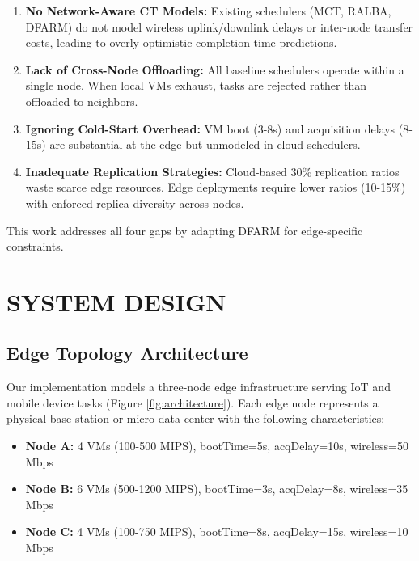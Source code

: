 \documentclass[12pt]{report}
\begin{document}
\begin{enumerate}
    \item \textbf{No Network-Aware CT Models:} Existing schedulers (MCT, RALBA, DFARM) do not model wireless uplink/downlink delays or inter-node transfer costs, leading to overly optimistic completion time predictions.
    
    \item \textbf{Lack of Cross-Node Offloading:} All baseline schedulers operate within a single node. When local VMs exhaust, tasks are rejected rather than offloaded to neighbors.
    
    \item \textbf{Ignoring Cold-Start Overhead:} VM boot (3-8s) and acquisition delays (8-15s) are substantial at the edge but unmodeled in cloud schedulers.
    
    \item \textbf{Inadequate Replication Strategies:} Cloud-based 30\% replication ratios waste scarce edge resources. Edge deployments require lower ratios (10-15\%) with enforced replica diversity across nodes.
\end{enumerate}

This work addresses all four gaps by adapting DFARM for edge-specific constraints.


\chapter{SYSTEM DESIGN}
\label{ch:design}

\section{Edge Topology Architecture}

Our implementation models a three-node edge infrastructure serving IoT and mobile device tasks (Figure \ref{fig:architecture}). Each edge node represents a physical base station or micro data center with the following characteristics:

\begin{itemize}
    \item \textbf{Node A:} 4 VMs (100-500 MIPS), bootTime=5s, acqDelay=10s, wireless=50 Mbps
    \item \textbf{Node B:} 6 VMs (500-1200 MIPS), bootTime=3s, acqDelay=8s, wireless=35 Mbps
    \item \textbf{Node C:} 4 VMs (100-750 MIPS), bootTime=8s, acqDelay=15s, wireless=10 Mbps
\end{itemize}
\end{document}
